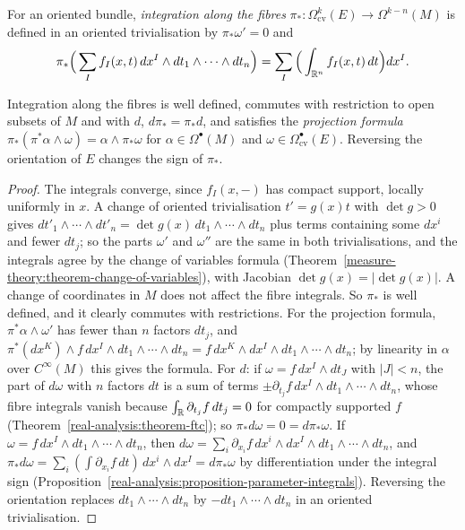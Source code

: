 \begin{definition}\label{characteristic-classes:definition-fibre-integration}
For an oriented bundle, \emph{integration along the fibres} $\pi_* \colon \Omega^k_{\mathrm{cv}}(E) \to \Omega^{k-n}(M)$ is defined in an oriented trivialisation by $\pi_*\omega' = 0$ and
\[
\pi_*\Big(\sum_If_I(x, t)\,dx^I \wedge dt_1 \wedge \cdots \wedge dt_n\Big) = \sum_I\Big(\int_{\mathbb{R}^n}f_I(x, t)\,dt\Big)dx^I.
\]
\end{definition}

\begin{proposition}\label{characteristic-classes:proposition-fibre-integration}
Integration along the fibres is well defined, commutes with restriction to open subsets of $M$ and with $d$, $d\pi_* = \pi_*d$, and satisfies the \emph{projection formula} $\pi_*(\pi^*\alpha \wedge \omega) = \alpha \wedge \pi_*\omega$ for
$\alpha \in \Omega^\bullet(M)$ and $\omega \in \Omega^\bullet_{\mathrm{cv}}(E)$. Reversing the orientation of $E$ changes the sign of $\pi_*$.
\end{proposition}

\begin{proof}
The integrals converge, since $f_I(x, -)$ has compact support, locally uniformly in $x$. A change of oriented trivialisation $t' = g(x)t$ with $\det g > 0$ gives $dt'_1 \wedge \cdots \wedge dt'_n = \det g(x)\,dt_1 \wedge \cdots \wedge dt_n$
plus terms containing some $dx^i$ and fewer $dt_j$; so the parts $\omega'$ and $\omega''$ are the same in both trivialisations, and the integrals agree by the change of variables formula
(Theorem~\ref{measure-theory:theorem-change-of-variables}), with Jacobian $\det g(x) = |\det g(x)|$. A change of coordinates in $M$ does not affect the fibre integrals. So $\pi_*$ is well defined, and it clearly commutes with
restrictions. For the projection formula, $\pi^*\alpha \wedge \omega'$ has fewer than $n$ factors $dt_j$, and $\pi^*(dx^K) \wedge f\,dx^I \wedge dt_1 \wedge \cdots \wedge dt_n = f\,dx^K \wedge dx^I \wedge dt_1 \wedge \cdots \wedge dt_n$; by linearity
in $\alpha$ over $C^\infty(M)$ this gives the formula. For $d$: if $\omega = f\,dx^I \wedge dt_J$ with $|J| < n$, the part of $d\omega$ with $n$ factors $dt$ is a sum of terms $\pm\partial_{t_j}f\,dx^I \wedge dt_1 \wedge \cdots \wedge dt_n$, whose fibre
integrals vanish because $\int_{\mathbb{R}}\partial_{t_j}f\,dt_j = 0$ for compactly supported $f$ (Theorem~\ref{real-analysis:theorem-ftc}); so $\pi_*d\omega = 0 = d\pi_*\omega$. If $\omega = f\,dx^I \wedge dt_1 \wedge \cdots \wedge dt_n$, then
$d\omega = \sum_i\partial_{x_i}f\,dx^i \wedge dx^I \wedge dt_1 \wedge \cdots \wedge dt_n$, and $\pi_*d\omega = \sum_i(\int\partial_{x_i}f\,dt)\,dx^i \wedge dx^I = d\pi_*\omega$ by differentiation under the integral sign
(Proposition~\ref{real-analysis:proposition-parameter-integrals}). Reversing the orientation replaces $dt_1 \wedge \cdots \wedge dt_n$ by $-dt_1 \wedge \cdots \wedge dt_n$ in an oriented trivialisation.
\end{proof}

